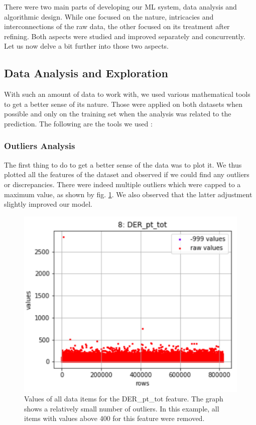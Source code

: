 \documentclass[10pt,conference,compsocconf]{IEEEtran}
\begin{document}
There were two main parts of developing our ML system, data analysis and algorithmic design. While one focused on the nature, intricacies and interconnections of the raw data, the other focused on its treatment after refining. Both aspects were studied and improved separately and concurrently.  Let us now delve a bit further into those two aspects.

\subsection{Data Analysis and Exploration}
With such an amount of data to work with, we used various mathematical tools to get a better sense of its nature.
Those were applied on both datasets when possible and only on the training set when the analysis was related to the prediction. The following are the tools we used :

\subsubsection{Outliers Analysis}
The first thing to do to get a better sense of the data was to plot it. We thus plotted all the features of the dataset and observed if we could find any outliers or discrepancies. There were indeed multiple outliers which were capped to a maximum value, as shown by fig. \ref{fig:outliers}. We also observed that the latter adjustment slightly improved our model.
\begin{figure}[tbp]
  \centering
  \includegraphics[width=0.77\columnwidth]{outliers}
  \caption{Values of all data items for the DER\_pt\_tot feature. The graph shows a relatively small number of outliers. In this example, all items with values above 400 for this feature were removed.}
  \vspace{-3mm}
  \label{fig:outliers}
\end{figure}
\end{document}
